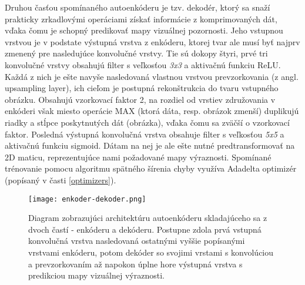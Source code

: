 Druhou časťou spomínaného autoenkóderu je tzv. dekodér, ktorý sa snaží prakticky zrkadlovými operáciami získať informácie z komprimovaných dát, vďaka čomu je schopný predikovať mapy vizuálnej pozornosti. Jeho vstupnou vrstvou je v podstate výstupná vrstva z enkóderu, ktorej tvar ale musí byť najprv zmenený pre nasledujúce konvolučné vrstvy. Tie sú dokopy štyri, prvé tri konvolučné vrstvy obsahujú filter s veľkosťou \textit{3x3} a aktivačnú funkciu ReLU. Každá z nich je ešte navyše nasledovaná vlastnou vrstvou
prevzorkovania (z angl. upsampling layer), ich cieľom je postupná rekonštrukcia do tvaru vstupného obrázku. Obsahujú vzorkovací faktor 2, na rozdiel od vrstiev združovania v enkóderi však miesto operácie MAX (ktorá dáta, resp. obrázok zmenší) duplikujú riadky a stĺpce poskytnutých dát (obrázka), vďaka čomu sa zväčší o vzorkovací faktor. Posledná výstupná konvolučná vrstva obsahuje filter s veľkosťou \textit{5x5} a aktivačnú funkciu sigmoid. Dátam na nej je ale ešte nutné predtransformovať na 2D maticu, reprezentujúce nami požadované mapy výraznosti. Spomínané trénovanie pomocu algoritmu spätného šírenia chyby využíva Adadelta optimizér (popísaný v časti \ref{optimizers}).

\begin{figure}[H]
	\begin{center}
		\texttt{[image: enkoder-dekoder.png]}
		\caption[Diagram navrhnutého autoenkóderu]{
			Diagram zobrazujúci architektúru autoenkóderu skladajúceho sa z dvoch častí - enkóderu a dekóderu. Postupne zdola prvá vstupná konvolučná vrstva nasledovaná ostatnými vyššie popísanými vrstvami enkóderu, potom dekóder so svojimi vrstami s konvolúciou a prevzorkovaním až napokon úplne hore výstupná vrstva s predikciou mapy vizuálnej výraznosti. 
		}\label{autoencoder_structure}
	\end{center}
\end{figure}



